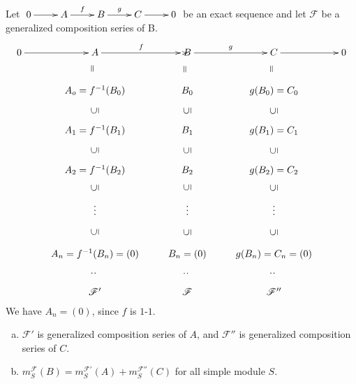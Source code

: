 Let $\xymatrix{0 \ar[r] & A\ar[r]^f & B\ar[r]^g & C \ar[r] & 0}$ be an exact sequence and let $\mathscr{F}$ be a generalized composition series of B.
\[\xymatrix
{0\ar[r] & A\ar[r]^f & B\ar[r]^g\ar & C\ar[r] & 0\\
			& A_o=f^{-1}(B_0)\ar@{}[u]|-*[@]{=}	  & B_0	\ar@{}[u]|-*[@]{=}				& g(B_0)= C_0\ar@{}[u]|-*[@]{=} \\
			& A_1=f^{-1}(B_1)\ar@{}[u]|-*[@]{\subseteq} & B_1\ar@{}[u]|-*[@]{\subseteq}& g(B_1)= C_1\ar@{}[u]|-*[@]{\subseteq} \\
			& A_2=f^{-1}(B_2)\ar@{}[u]|-*[@]{\subseteq} & B_2\ar@{}[u]|-*[@]{\subseteq}& g(B_2)= C_2\ar@{}[u]|-*[@]{\subseteq} \\
			& \vdots\ar@{}[u]|-*[@]{\subseteq} & \vdots\ar@{}[u]|-*[@]{\subseteq}& \vdots\ar@{}[u]|-*[@]{\subseteq} \\
			& A_n=f^{-1}(B_n)=(0)\ar@{}[u]|-*[@]{\subseteq} & B_n=(0)\ar@{}[u]|-*[@]{\subseteq}& g(B_n)= C_n=(0)\ar@{}[u]|-*[@]{\subseteq} \\
			& \mathscr{F}'\ar@{}[u]|-*[@]{\colon} & \mathscr{F}\ar@{}[u]|-*[@]{\colon}& \mathscr{F}''\ar@{}[u]|-*[@]{\colon} \\
}\]
We have $A_n=(0)$, since $f$ is $1$-$1$.
\addtocounter{thm}{1}
\begin{prop}\label{prop:7}
\begin{enumerate}[(a)]
\item $\mathscr{F}'$ is generalized composition series
  of $A$, and $\mathscr{F}''$ is generalized composition series of $C$.
\item $m^{\mathscr{F}}_S(B)=m^{\mathscr{F}'}_S(A) +
  m^{\mathscr{F}''}_S(C)$ for all simple module $S$. 
\end{enumerate}
\end{prop}
